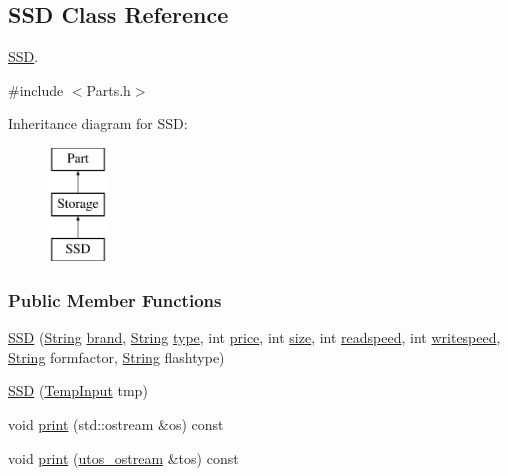 \subsection{S\+SD Class Reference}
\label{class_s_s_d}


\mbox{\hyperlink{class_s_s_d}{S\+SD}}.  




{\ttfamily \#include $<$Parts.\+h$>$}

Inheritance diagram for S\+SD\+:\begin{figure}[H]
\begin{center}
\leavevmode
\includegraphics[height=3.000000cm]{class_s_s_d}
\end{center}
\end{figure}
\subsubsection*{Public Member Functions}
\begin{DoxyCompactItemize}
\item 
\mbox{\hyperlink{class_s_s_d_a1e80104276b02f8ca6f016f41a2a5f41}{S\+SD}} (\mbox{\hyperlink{class_string}{String}} \mbox{\hyperlink{class_part_ae06f2fdeb7fbbdb229a7aca151f3e341}{brand}}, \mbox{\hyperlink{class_string}{String}} \mbox{\hyperlink{class_part_a101dbcc5c4b21564df7414c7eb0eae88}{type}}, int \mbox{\hyperlink{class_part_a8e71223aed1da95a974f33d8d6c91bb1}{price}}, int \mbox{\hyperlink{class_storage_abcc80ce58a21fa884035617ee0b6cb67}{size}}, int \mbox{\hyperlink{class_storage_a41073842ff16961dad3903e6dd49bb0c}{readspeed}}, int \mbox{\hyperlink{class_storage_a0198a1483ccf849d48c76da88599ba8b}{writespeed}}, \mbox{\hyperlink{class_string}{String}} formfactor, \mbox{\hyperlink{class_string}{String}} flashtype)
\item 
\mbox{\hyperlink{class_s_s_d_a39a5322942a5320a9a2be8ac7cb4c596}{S\+SD}} (\mbox{\hyperlink{struct_temp_input}{Temp\+Input}} tmp)
\item 
void \mbox{\hyperlink{class_s_s_d_a3c07aa0fd7bb547cfb4a775513e427a9}{print}} (std\+::ostream \&os) const
\item 
void \mbox{\hyperlink{class_s_s_d_ab07086e302f8be99cfa757583d2017a0}{print}} (\mbox{\hyperlink{structutos__ostream}{utos\+\_\+ostream}} \&tos) const
\end{DoxyCompactItemize}
